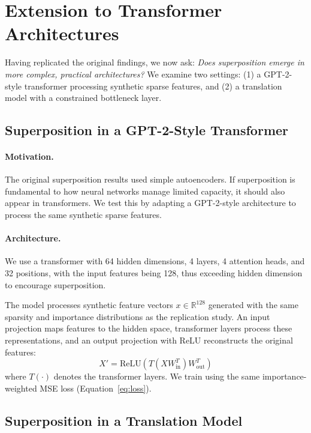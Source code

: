 \section{Extension to Transformer Architectures}

Having replicated the original findings, we now ask: \emph{Does superposition emerge in more complex, practical architectures?} We examine two settings: (1) a GPT-2-style transformer processing synthetic sparse features, and (2) a translation model with a constrained bottleneck layer.

\subsection{Superposition in a GPT-2-Style Transformer}

\paragraph{Motivation.} The original superposition results used simple autoencoders. If superposition is fundamental to how neural networks manage limited capacity, it should also appear in transformers. We test this by adapting a GPT-2-style architecture to process the same synthetic sparse features.

\paragraph{Architecture.} We use a transformer with 64 hidden dimensions, 4 layers, 4 attention heads, and 32 positions, with the input features being 128, thus exceeding hidden dimension to encourage superposition.

The model processes synthetic feature vectors $x \in \mathbb{R}^{128}$ generated with the same sparsity and importance distributions as the replication study. An input projection maps features to the hidden space, transformer layers process these representations, and an output projection with ReLU reconstructs the original features:
\begin{equation}
X' = \text{ReLU}\left(T(X W_{\text{in}}^T) W_{\text{out}}^T\right)
\end{equation}
where $T(\cdot)$ denotes the transformer layers. We train using the same importance-weighted MSE loss (Equation~\ref{eq:loss}).

\subsection{Superposition in a Translation Model}

